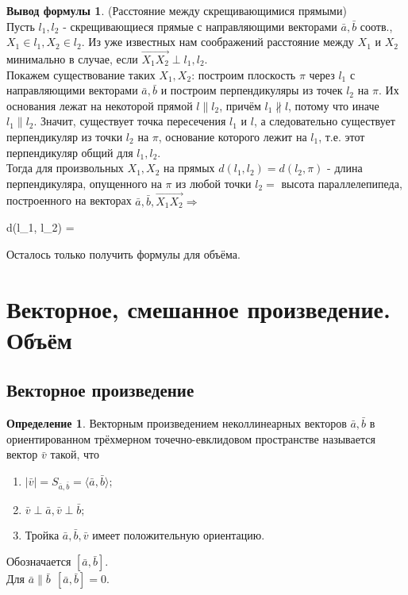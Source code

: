 \documentclass[a4paper, 12pt]{article}
\theoremstyle{definition}
\newtheorem*{definition}{Определение}
\newtheorem*{formula}{Вывод формулы}
\newenvironment{boxedalign*}
  {\begin{equation*}\begin{lrbox}{\boxedalignbox}$\begin{aligned}}
  {\end{aligned}$\end{lrbox}\fbox{\usebox{\boxedalignbox}}\end{equation*}}
\begin{document}
	\begin{formula}(Расстояние между скрещивающимися прямыми)\\
		Пусть $l_1, l_2$ - скрещивающиеся прямые с направляющими векторами $\bar{a}, \bar{b}$ соотв., $X_1 \in l_1, X_2 \in l_2$. Из уже известных нам соображений расстояние между $X_1$ и $X_2$ минимально в случае, если $\overrightarrow{X_1X_2} \perp l_1, l_2$.\\Покажем существование таких $X_1, X_2$: построим плоскость $\pi$ через $l_1$ с направляющими векторами $\bar{a}, \bar{b}$ и построим перпендикуляры из точек $l_2$ на $\pi$. Их основания лежат на некоторой прямой $l \parallel l_2$, причём $l_1 \nparallel l$, потому что иначе $l_1 \parallel l_2$. Значит, существует точка пересечения $l_1$ и $l$, а следовательно существует перпендикуляр из точки $l_2$ на $\pi$, основание которого лежит на $l_1$, т.е. этот перпендикуляр общий для $l_1, l_2$.\\
		Тогда для произвольных $X_1, X_2$ на прямых $d(l_1, l_2) = d(l_2, \pi)$ - длина перпендикуляра, опущенного на $\pi$ из любой точки $l_2 =$ высота параллелепипеда, построенного на векторах $\bar{a}, \bar{b}, \overrightarrow{X_1X_2} \Rightarrow$
		\begin{boxedalign*}
			d(l_1, l_2) = 
		\end{boxedalign*}
		Осталось только получить формулы для объёма.
	\end{formula}
	\section{Векторное, смешанное произведение. Объём}
	\subsection{Векторное произведение}
	\begin{definition}
		Векторным произведением неколлинеарных векторов $\bar{a}, \bar{b}$ в ориентированном трёхмерном точечно-евклидовом пространстве называется вектор $\bar{v}$ такой, что\begin{enumerate}
			\item $|\bar{v}| = S_{\bar{a},\bar{b}} = \langle\bar{a}, \bar{b}\rangle;$
			\item $\bar{v} \perp \bar{a}, \bar{v} \perp \bar{b};$
			\item Тройка $\bar{a}, \bar{b}, \bar{v}$ имеет положительную ориентацию.
		\end{enumerate}
		Обозначается $[\bar{a}, \bar{b}]$.\\
		Для $\bar{a} \parallel \bar{b} \ \ [\bar{a}, \bar{b}] = 0$. 
	\end{definition}
\end{document}

